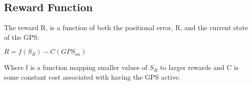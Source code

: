 \documentclass[12pt,openany,a4paper]{book}
\begin{document}
\subsection*{Reward Function}
The reward R, is a function of both the positional error, R, and the current state of the GPS:

\ensuremath{R = f(S_R) - C(GPS_{on}) }

\noindent Where f is a function mapping smaller values of \ensuremath{S_R} to larger rewards and C is some constant cost associated with having the GPS active.


%
%
%
\end{document}
